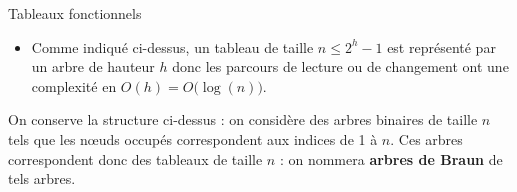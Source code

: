 \begin{exo}{Tableaux fonctionnels}{}
\begin{itemize}
On verra que les tableaux fonctionnels ont une structure équilibrée et que les fils sont similaires, le fils gauche ayant un terme de plus. On peut retrouver un algorithme récursif

\begin{ocaml}
let rec creeTableau n x =
  if n = 0
  then Vide
  else let k = (n-1)/2 in
       Noeud(creeTableau (n-1-k) x,x,creeTableau k x));;
\end{ocaml}

\item Comme indiqué ci-dessus, un tableau de taille $n\le 2^h-1$ est représenté par un arbre de hauteur $h$ donc les parcours de lecture ou de changement ont une complexité en $O(h)=O\bigl(\log(n)\bigr)$.
\end{itemize}
\end{exo}
On conserve la structure ci-dessus : on considère des arbres binaires de taille $n$ tels que les nœuds occupés correspondent aux indices de 1 à $n$. Ces arbres correspondent donc des tableaux de taille $n$ : on nommera {\bf arbres de Braun} de tels arbres.


